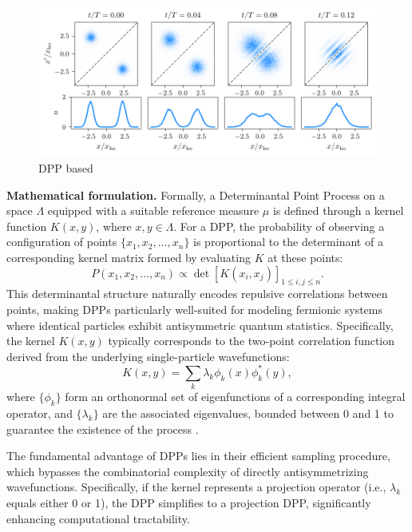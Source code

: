 \begin{figure}
    \centering
    \includegraphics{fig-py/interference_dpp.pdf}
    \caption{DPP based}
    \label{fig:interference-dpp}
\end{figure}


\textbf{Mathematical formulation.}
Formally, a Determinantal Point Process on a space $\Lambda$ equipped with a suitable reference measure $\mu$ is defined through a kernel function $K(x,y)$, where $x,y \in \Lambda$. For a DPP, the probability of observing a configuration of points $\{x_1, x_2, \ldots, x_n\}$ is proportional to the determinant of a corresponding kernel matrix formed by evaluating $K$ at these points:
\begin{equation}
P(x_1, x_2, \ldots, x_n) \propto \det[K(x_i, x_j)]_{1 \leq i,j \leq n}.
\end{equation}
This determinantal structure naturally encodes repulsive correlations between points, making DPPs particularly well-suited for modeling fermionic systems where identical particles exhibit antisymmetric quantum statistics. Specifically, the kernel $K(x,y)$ typically corresponds to the two-point correlation function derived from the underlying single-particle wavefunctions:
\begin{equation}
K(x, y) = \sum_{k} \lambda_k \phi_k(x)\phi_k^*(y),
\end{equation}
where $\{\phi_k\}$ form an orthonormal set of eigenfunctions of a corresponding integral operator, and $\{\lambda_k\}$ are the associated eigenvalues, bounded between 0 and 1 to guarantee the existence of the process \cite{hough_determinantal_2006}.

The fundamental advantage of DPPs lies in their efficient sampling procedure, which bypasses the combinatorial complexity of directly antisymmetrizing wavefunctions. Specifically, if the kernel represents a projection operator (i.e., $\lambda_k$ equals either 0 or 1), the DPP simplifies to a projection DPP, significantly enhancing computational tractability.

